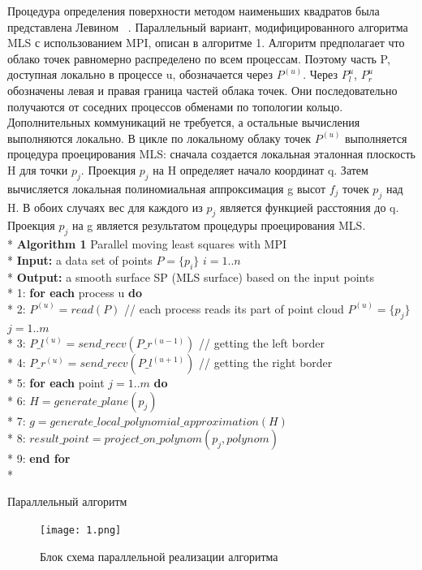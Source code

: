 Процедура определения поверхности методом наименьших квадратов была представлена Левином ~\cite{LEVIN}. Параллельный вариант, модифицированного алгоритма MLS с использованием MPI, описан в алгоритме 1. Алгоритм предполагает что облако точек равномерно распределено по всем процессам. Поэтому часть P, доступная локально в процессе u, обозначается через $P^{(u)}$. Через $P_l^{u}$, $P_r^{u}$ обозначены левая и правая граница частей облака точек. Они последовательно получаются от соседних процессов обменами по топологии кольцо. Дополнительных коммуникаций не требуется, а остальные вычисления выполняются локально. В цикле по локальному облаку точек $P^{(u)}$ выполняется процедура проецирования MLS: сначала создается локальная эталонная плоскость H для точки $p_j$. Проекция $p_j$ на H определяет начало координат q. Затем вычисляется локальная полиномиальная аппроксимация g высот $f_j$ точек $p_j$ над H. В обоих случаях вес для каждого из $p_j$ является функцией расстояния до q. Проекция $p_j$ на g является результатом процедуры проецирования MLS. \\*
\textbf{Algorithm 1}  Parallel moving least squares with MPI \\*
\textbf{Input:} a data set of points $P = \{p_i\}$ $i = 1..n$ \\*
\textbf{Output:} a smooth surface SP (MLS surface) based on the input
points \\*
1: \textbf{for each} process u \textbf{do} \\*
2: \quad $P^{(u)} = read(P)$ // each process reads its part of point cloud $P^{(u)} = \{p_j\}$ $j = 1..m$ \\*
3: \quad $P\_l^{(u)} = send\_recv(P\_r^{(u-1)})$ // getting the left border\\* 
4: \quad $P\_r^{(u)} = send\_recv(P\_l^{(u+1)})$ // getting the right border\\*
5: \quad\textbf{for each} point $j = 1..m $ \textbf{do}\\*
6: \quad\quad$H = generate\_plane(p_j)$ \\*
7: \quad\quad$g = generate\_local\_polynomial\_approximation(H)$ \\*
8: \quad\quad$result\_point = project\_on\_polynom(p_j, polynom)$ \\*
9: \quad\textbf{end for} \\*




Параллельный алгоритм

\begin{figure}[h]
    \centering
    \texttt{[image: 1.png]}
    \caption{Блок схема параллельной реализации алгоритма}
    \label{fig:mesh1}
\end{figure}


